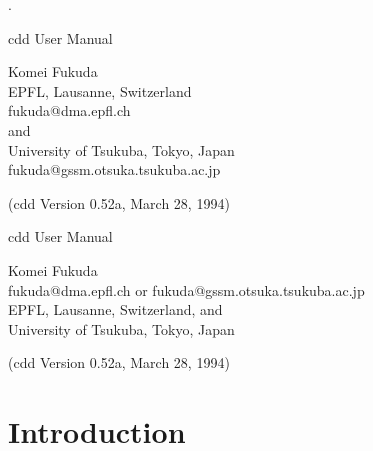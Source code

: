 %
\renewcommand{\baselinestretch}{1.0}
\setlength{\oddsidemargin}{8mm}
\setlength{\textwidth}{16cm}
\setlength{\topmargin}{10mm}
\setlength{\textheight}{23cm}
\setlength{\headsep}{0in}
\setlength{\headheight}{0pt}

\pagestyle{empty}



.\vspace{20mm}

\begin{center}



\vspace{20mm}

{\LARGE cdd User Manual}

\vspace{20mm}

{\Large Komei Fukuda\\
   EPFL, Lausanne, Switzerland\\
   fukuda@dma.epfl.ch\\
   and\\
   University of Tsukuba, Tokyo, Japan\\
  fukuda@gssm.otsuka.tsukuba.ac.jp
}

\vspace{20mm}
{\Large (cdd Version 0.52a,  March 28, 1994)}

\end{center}

\newpage
\pagestyle{plain}
\setcounter{page}{1} 

\begin{center}

{\Large cdd User Manual}

\bigskip
{\large Komei Fukuda\\
   fukuda@dma.epfl.ch  or  fukuda@gssm.otsuka.tsukuba.ac.jp\\
   EPFL, Lausanne, Switzerland, and\\
   University of Tsukuba, Tokyo, Japan}

\bigskip
{\large (cdd Version 0.52a,  March 28, 1994)}

\end{center}

\section{Introduction} \label{INTRODUCTION}

